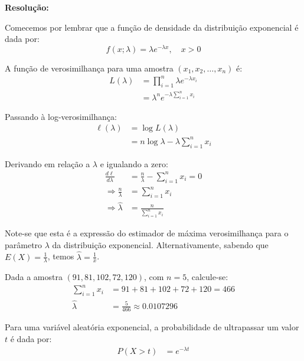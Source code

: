 \documentclass[a4paper,12pt]{article}
\begin{document}
\begin{enumerate}
    \vspace{0.3cm}

    \begin{mdframed}[backgroundcolor=gray!10, linewidth=0pt, innertopmargin=10pt, innerbottommargin=10pt]
    \textbf{Resolução:}

    Comecemos por lembrar que a função de densidade da distribuição exponencial é dada por:
    \[
    f(x; \lambda) = \lambda e^{-\lambda x}, \quad x > 0
    \]

    A função de verosimilhança para uma amostra \( (x_1, x_2, \ldots, x_n) \) é:
    \begin{align*}
    L(\lambda) &= \prod_{i=1}^n \lambda e^{-\lambda x_i} \\
    &= \lambda^n e^{-\lambda \sum_{i=1}^n x_i}
    \end{align*}

    Passando à log-verosimilhança:
    \begin{align*}
    \ell(\lambda) &= \log L(\lambda) \\
    &= n \log \lambda - \lambda \sum_{i=1}^n x_i
    \end{align*}

    Derivando em relação a \( \lambda \) e igualando a zero:
    \begin{align*}
    \frac{d\ell}{d\lambda} &= \frac{n}{\lambda} - \sum_{i=1}^n x_i = 0 \\
    \Rightarrow \frac{n}{\lambda} &= \sum_{i=1}^n x_i \\
    \Rightarrow \hat{\lambda} &= \frac{n}{\sum_{i=1}^n x_i}
    \end{align*}

    Note-se que esta é a expressão do estimador de máxima verosimilhança para o parâmetro \( \lambda \) da distribuição exponencial. Alternativamente, sabendo que \( E(X) = \frac{1}{\lambda} \), temos \( \hat{\lambda} = \frac{1}{\bar{x}} \).

    Dada a amostra \( (91, 81, 102, 72, 120) \), com \( n = 5 \), calcule-se:
    \begin{align*}
    \sum_{i=1}^n x_i &= 91 + 81 + 102 + 72 + 120 = 466 \\
    \hat{\lambda} &= \frac{5}{466} \approx 0.0107296
    \end{align*}

    Para uma variável aleatória exponencial, a probabilidade de ultrapassar um valor \( t \) é dada por:
    \begin{align*}
    P(X > t) &= e^{-\lambda t}
    \end{align*}


\end{mdframed}
\end{enumerate}
\end{document}
